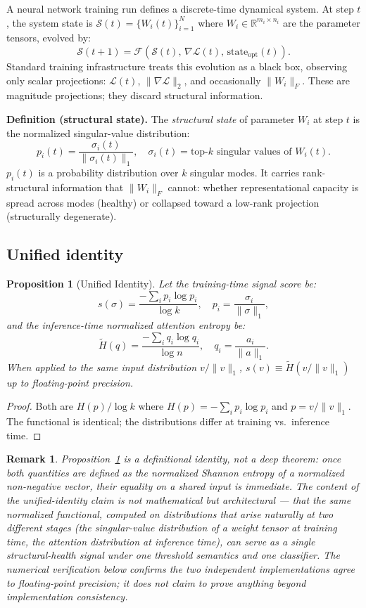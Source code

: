 \documentclass[11pt,a4paper]{article}
\theoremstyle{plain}
\newtheorem{proposition}{Proposition}
\newtheorem{remark}{Remark}
\begin{document}
A neural network training run defines a discrete-time dynamical system.
At step $t$, the system state is
$\mathcal{S}(t) = \{W_i(t)\}_{i=1}^{N}$ where
$W_i \in \mathbb{R}^{m_i \times n_i}$ are the parameter tensors,
evolved by:
\[
  \mathcal{S}(t+1) = \mathcal{F}(\mathcal{S}(t),\,
  \nabla\mathcal{L}(t),\, \text{state}_{\text{opt}}(t)).
\]
Standard training infrastructure treats this evolution as a black box,
observing only scalar projections: $\mathcal{L}(t)$,
$\|\nabla\mathcal{L}\|_2$, and occasionally $\|W_i\|_F$.
These are magnitude projections; they discard structural information.

\textbf{Definition (structural state).}
The \emph{structural state} of parameter $W_i$ at step $t$ is the
normalized singular-value distribution:
\[
  p_i(t) = \frac{\sigma_i(t)}{\|\sigma_i(t)\|_1},\quad
  \sigma_i(t) = \text{top-}k\text{ singular values of }W_i(t).
\]
$p_i(t)$ is a probability distribution over $k$ singular modes.
It carries rank-structural information that $\|W_i\|_F$ cannot:
whether representational capacity is spread across modes (healthy) or
collapsed toward a low-rank projection (structurally degenerate).

\subsection{Unified identity}
\label{sec:identity}

\begin{proposition}[Unified Identity]
\label{prop:unified}
Let the training-time \emph{signal score} be:
\[
  s(\sigma) = \frac{-\sum_i p_i \log p_i}{\log k},\quad
  p_i = \frac{\sigma_i}{\|\sigma\|_1},
\]
and the inference-time \emph{normalized attention entropy} be:
\[
  \tilde{H}(q) = \frac{-\sum_i q_i \log q_i}{\log n},\quad
  q_i = \frac{a_i}{\|a\|_1}.
\]
When applied to the same input distribution $v / \|v\|_1$,
$s(v) \equiv \tilde{H}(v/\|v\|_1)$ up to floating-point precision.
\end{proposition}

\begin{proof}
Both are $H(p)/\log k$ where $H(p) = -\sum_i p_i \log p_i$ and
$p = v/\|v\|_1$.
The functional is identical; the distributions differ at training
vs.\ inference time.
\end{proof}

\begin{remark}
Proposition~\ref{prop:unified} is a definitional identity, not a deep
theorem: once both quantities are defined as the normalized Shannon
entropy of a normalized non-negative vector, their equality on a shared
input is immediate. The content of the unified-identity claim is not
mathematical but architectural --- that the \emph{same} normalized
functional, computed on distributions that arise naturally at two
different stages (the singular-value distribution of a weight tensor at
training time, the attention distribution at inference time), can serve
as a single structural-health signal under one threshold semantics and
one classifier. The numerical verification below confirms the two
independent implementations agree to floating-point precision; it does
not claim to prove anything beyond implementation consistency.
\end{remark}
\end{document}
